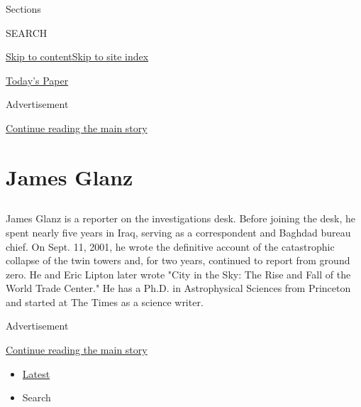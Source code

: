 Sections

SEARCH

\protect\hyperlink{site-content}{Skip to
content}\protect\hyperlink{site-index}{Skip to site index}

\href{https://myaccount.nytimes.com/auth/login?response_type=cookie\&client_id=vi}{}

\href{https://www.nytimes.com/section/todayspaper}{Today's Paper}

Advertisement

\protect\hyperlink{after-top}{Continue reading the main story}

\hypertarget{james-glanz}{%
\section{James Glanz}\label{james-glanz}}

\subsection{}

James Glanz is a reporter on the investigations desk. Before joining the
desk, he spent nearly five years in Iraq, serving as a correspondent and
Baghdad bureau chief. On Sept. 11, 2001, he wrote the definitive account
of the catastrophic collapse of the twin towers and, for two years,
continued to report from ground zero. He and Eric Lipton later wrote
"City in the Sky: The Rise and Fall of the World Trade Center." He has a
Ph.D. in Astrophysical Sciences from Princeton and started at The Times
as a science writer.

Advertisement

\protect\hyperlink{after-mid1}{Continue reading the main story}

\begin{itemize}
\tightlist
\item
  \protect\hyperlink{stream-panel}{Latest}
\item
  Search
\end{itemize}

